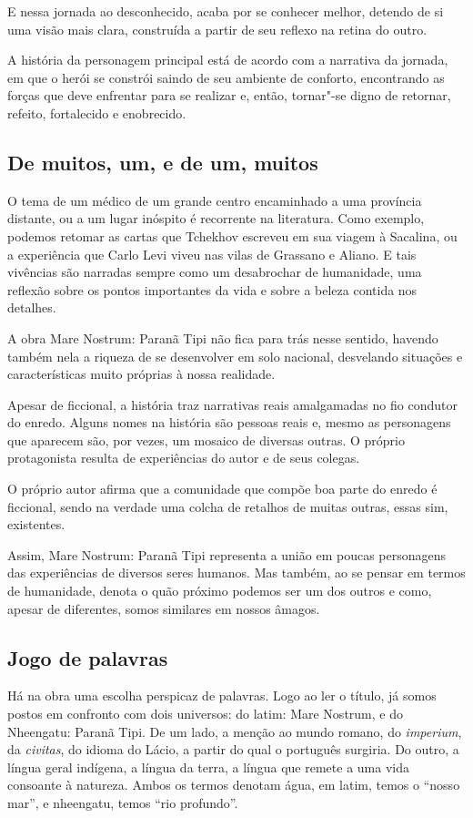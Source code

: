 \documentclass[12pt]{extarticle}
\begin{document}
E nessa jornada ao desconhecido, acaba por se conhecer melhor, detendo
de si uma visão mais clara, construída a partir de seu reflexo na retina
do outro.

A história da personagem principal está de acordo com a narrativa da
jornada, em que o herói se constrói saindo de seu ambiente de conforto,
encontrando as forças que deve enfrentar para se realizar e, então,
tornar"-se digno de retornar, refeito, fortalecido e enobrecido.

\subsection{De muitos, um, e de um, muitos}

O tema de um médico de um grande centro encaminhado a uma província
distante, ou a um lugar inóspito é recorrente na literatura. Como
exemplo, podemos retomar as cartas que Tchekhov escreveu em sua viagem à
Sacalina, ou a experiência que Carlo Levi viveu nas vilas de Grassano e
Aliano. E tais vivências são narradas sempre como um desabrochar de
humanidade, uma reflexão sobre os pontos importantes da vida e sobre a
beleza contida nos detalhes.

A obra Mare Nostrum: Paranã Tipi não fica para trás nesse sentido,
havendo também nela a riqueza de se desenvolver em solo nacional,
desvelando situações e características muito próprias à nossa realidade.

Apesar de ficcional, a história traz narrativas reais amalgamadas no fio
condutor do enredo. Alguns nomes na história são pessoas reais e, mesmo
as personagens que aparecem são, por vezes, um mosaico de diversas
outras. O próprio protagonista resulta de experiências do autor e de
seus colegas.

O próprio autor afirma que a comunidade que compõe boa parte do enredo é
ficcional, sendo na verdade uma colcha de retalhos de muitas outras,
essas sim, existentes.

Assim, Mare Nostrum: Paranã Tipi representa a união em poucas
personagens das experiências de diversos seres humanos. Mas também, ao
se pensar em termos de humanidade, denota o quão próximo podemos ser um
dos outros e como, apesar de diferentes, somos similares em nossos
âmagos.

\subsection{Jogo de palavras}

Há na obra uma escolha perspicaz de palavras. Logo ao ler o título, já
somos postos em confronto com dois universos: do latim: Mare Nostrum, e
do Nheengatu: Paranã Tipi. De um lado, a menção ao mundo romano, do
\emph{imperium}, da \emph{civitas}, do idioma do Lácio, a partir do qual
o português surgiria. Do outro, a língua geral indígena, a língua da
terra, a língua que remete a uma vida consoante à natureza. Ambos os
termos denotam água, em latim, temos o ``nosso mar'', e nheengatu, temos
``rio profundo''.
\end{document}
